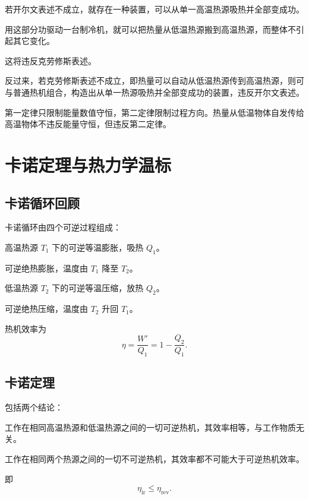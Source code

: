 \begin{MethodBox}[等价性证明思路]
\begin{ReviewList}
  \item 若开尔文表述不成立，就存在一种装置，可以从单一高温热源吸热并全部变成功。
  \item 用这部分功驱动一台制冷机，就可以把热量从低温热源搬到高温热源，而整体不引起其它变化。
  \item 这将违反克劳修斯表述。
  \item 反过来，若克劳修斯表述不成立，即热量可以自动从低温热源传到高温热源，则可与普通热机组合，构造出从单一热源吸热并全部变成功的装置，违反开尔文表述。
\end{ReviewList}
\end{MethodBox}

\begin{WarnBox}
第一定律只限制能量数值守恒，第二定律限制过程方向。热量从低温物体自发传给高温物体不违反能量守恒，但违反第二定律。
\end{WarnBox}

\section{卡诺定理与热力学温标}

\subsection{卡诺循环回顾}

卡诺循环由四个可逆过程组成：
\begin{ReviewList}
  \item 高温热源 \(T_1\) 下的可逆等温膨胀，吸热 \(Q_1\)。
  \item 可逆绝热膨胀，温度由 \(T_1\) 降至 \(T_2\)。
  \item 低温热源 \(T_2\) 下的可逆等温压缩，放热 \(Q_2\)。
  \item 可逆绝热压缩，温度由 \(T_2\) 升回 \(T_1\)。
\end{ReviewList}

热机效率为
\[
  \eta=\frac{W'}{Q_1}=1-\frac{Q_2}{Q_1}.
\]

\subsection{卡诺定理}

包括两个结论：

\begin{FormulaBox}[卡诺定理]
\begin{ReviewList}
  \item 工作在相同高温热源和低温热源之间的一切可逆热机，其效率相等，与工作物质无关。
  \item 工作在相同两个热源之间的一切不可逆热机，其效率都不可能大于可逆热机效率。
\end{ReviewList}
即
\[
  \eta_{\mathrm{ir}}\le \eta_{\mathrm{rev}}.
\]
\end{FormulaBox}

